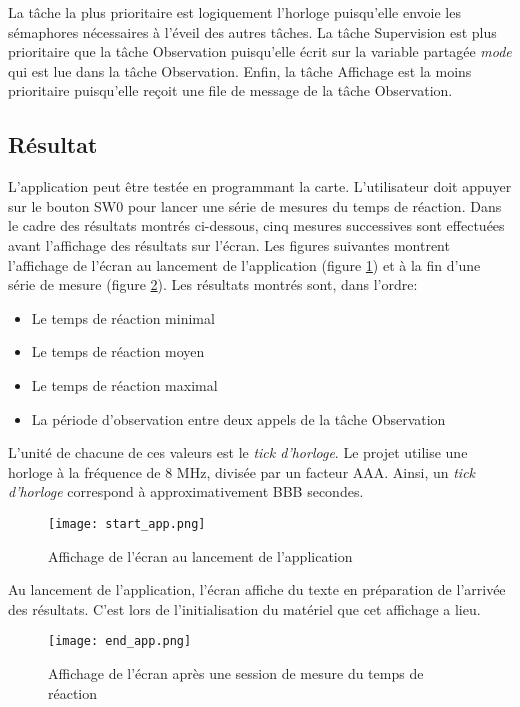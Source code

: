 \indent La tâche la plus prioritaire est logiquement l'horloge puisqu'elle envoie les sémaphores nécessaires à l'éveil des autres tâches.
La tâche Supervision est plus prioritaire que la tâche Observation puisqu'elle écrit sur la variable partagée \textit{mode} qui est lue dans la tâche Observation.
Enfin, la tâche Affichage est la moins prioritaire puisqu'elle reçoit une file de message de la tâche Observation.

\subsection{Résultat}

L'application peut être testée en programmant la carte.
L'utilisateur doit appuyer sur le bouton SW0 pour lancer une série de mesures du temps de réaction.
Dans le cadre des résultats montrés ci-dessous, cinq mesures successives sont effectuées avant l'affichage des résultats sur l'écran.
Les figures suivantes montrent l'affichage de l'écran au lancement de l'application (figure \ref{fig:start_app}) et à la fin d'une série de mesure (figure \ref{fig:end_app}).
Les résultats montrés sont, dans l'ordre:

\begin{itemize}
    \item Le temps de réaction minimal
    \item Le temps de réaction moyen
    \item Le temps de réaction maximal
    \item La période d'observation entre deux appels de la tâche Observation
\end{itemize}

L'unité de chacune de ces valeurs est le \textit{tick d'horloge}.
Le projet utilise une horloge à la fréquence de 8 MHz, divisée par un facteur AAA.
Ainsi, un \textit{tick d'horloge} correspond à approximativement BBB secondes.

\begin{figure}[h]
    \centering
    \texttt{[image: start\_app.png]}
    \caption{Affichage de l'écran au lancement de l'application}
    \label{fig:start_app}
\end{figure}

Au lancement de l'application, l'écran affiche du texte en préparation de l'arrivée des résultats.
C'est lors de l'initialisation du matériel que cet affichage a lieu.

\begin{figure}[h]
    \centering
    \texttt{[image: end\_app.png]}
    \caption{Affichage de l'écran après une session de mesure du temps de réaction}
    \label{fig:end_app}
\end{figure}

